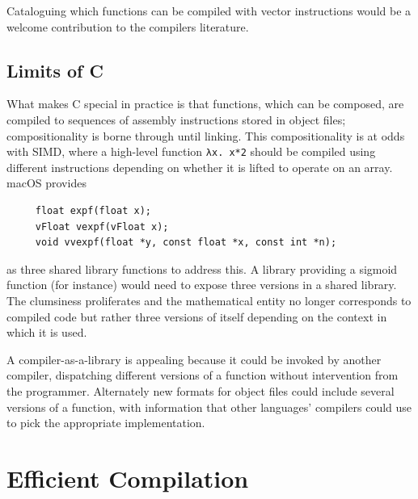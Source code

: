 \documentclass{article}
\begin{document}

Cataloguing which functions can be compiled with vector instructions would be a welcome contribution to the compilers literature.


\subsection{Limits of C}

What makes C special in practice is that functions, which can be composed, are compiled to sequences of assembly instructions stored in object files; compositionality is borne through until linking. This compositionality is at odds with SIMD, where a high-level function \verb|λx. x*2| should be compiled using different instructions depending on whether it is lifted to operate on an array. macOS provides

\begin{verbatim}
     float expf(float x);
     vFloat vexpf(vFloat x);
     void vvexpf(float *y, const float *x, const int *n);
\end{verbatim}

as three shared library functions to address this.
A library providing a sigmoid function (for instance) would need to expose three versions in a shared library. The clumsiness proliferates and the mathematical entity no longer corresponds to compiled code but rather three versions of itself depending on the context in which it is used.

A compiler-as-a-library is appealing because it could be invoked by another compiler, dispatching different versions of a function without intervention from the programmer. Alternately new formats for object files could include several versions of a function, with information that other languages' compilers could use to pick the appropriate implementation.


\section{Efficient Compilation}
\end{document}
